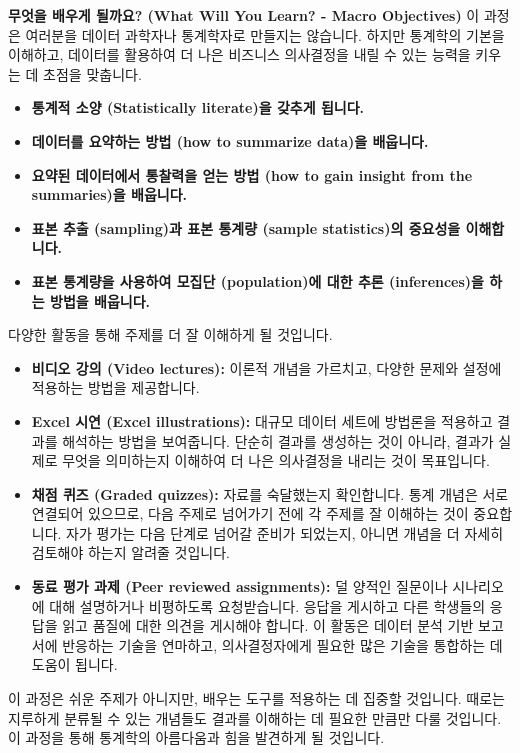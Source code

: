 \documentclass[11pt,a4paper]{article}
\begin{document}
\begin{summarybox}
\textbf{무엇을 배우게 될까요? (What Will You Learn? - Macro Objectives)}
이 과정은 여러분을 데이터 과학자나 통계학자로 만들지는 않습니다. 하지만 통계학의 기본을 이해하고, 데이터를 활용하여 더 나은 비즈니스 의사결정을 내릴 수 있는 능력을 키우는 데 초점을 맞춥니다.

\begin{itemize}
    \item \textbf{통계적 소양 (Statistically literate)을 갖추게 됩니다.}
    \item \textbf{데이터를 요약하는 방법 (how to summarize data)을 배웁니다.}
    \item \textbf{요약된 데이터에서 통찰력을 얻는 방법 (how to gain insight from the summaries)을 배웁니다.}
    \item \textbf{표본 추출 (sampling)과 표본 통계량 (sample statistics)의 중요성을 이해합니다.}
    \item \textbf{표본 통계량을 사용하여 모집단 (population)에 대한 추론 (inferences)을 하는 방법을 배웁니다.}
\end{itemize}
\end{summarybox}

\begin{tcolorbox}[title={어떻게 배우게 될까요? (How Will You Learn?)}]
다양한 활동을 통해 주제를 더 잘 이해하게 될 것입니다.
\begin{itemize}
    \item \textbf{비디오 강의 (Video lectures):} 이론적 개념을 가르치고, 다양한 문제와 설정에 적용하는 방법을 제공합니다.
    \item \textbf{Excel 시연 (Excel illustrations):} 대규모 데이터 세트에 방법론을 적용하고 결과를 해석하는 방법을 보여줍니다. 단순히 결과를 생성하는 것이 아니라, 결과가 실제로 무엇을 의미하는지 이해하여 더 나은 의사결정을 내리는 것이 목표입니다.
    \item \textbf{채점 퀴즈 (Graded quizzes):} 자료를 숙달했는지 확인합니다. 통계 개념은 서로 연결되어 있으므로, 다음 주제로 넘어가기 전에 각 주제를 잘 이해하는 것이 중요합니다. 자가 평가는 다음 단계로 넘어갈 준비가 되었는지, 아니면 개념을 더 자세히 검토해야 하는지 알려줄 것입니다.
    \item \textbf{동료 평가 과제 (Peer reviewed assignments):} 덜 양적인 질문이나 시나리오에 대해 설명하거나 비평하도록 요청받습니다. 응답을 게시하고 다른 학생들의 응답을 읽고 품질에 대한 의견을 게시해야 합니다. 이 활동은 데이터 분석 기반 보고서에 반응하는 기술을 연마하고, 의사결정자에게 필요한 많은 기술을 통합하는 데 도움이 됩니다.
\end{itemize}
이 과정은 쉬운 주제가 아니지만, 배우는 도구를 적용하는 데 집중할 것입니다. 때로는 지루하게 분류될 수 있는 개념들도 결과를 이해하는 데 필요한 만큼만 다룰 것입니다. 이 과정을 통해 통계학의 아름다움과 힘을 발견하게 될 것입니다.
\end{tcolorbox}
\end{document}
